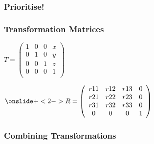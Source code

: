 \documentclass{beamer}
\begin{document}
\begin{frame} \frametitle{Prioritise!}
\end{frame}














\begin{frame} \frametitle{Transformation Matrices}
\begin{math}
T = \left( \begin{array}{cccc}
1 & 0 & 0 & x\\
0 & 1 & 0 & y\\
0 & 0 & 1 & z\\
0 & 0 & 0 & 1\\
\end{array} \right)
\end{math}

\begin{math}
\onslide+<2-> 
R = \left( \begin{array}{cccc}
r11 & r12 & r13 & 0\\
r21 & r22 & r23 & 0\\
r31 & r32 & r33 & 0\\
0 & 0 & 0 & 1\\
\end{array} \right)
\end{math}

\end{frame}

\begin{frame} \frametitle{Combining Transformations}
\begin{figure}[!ht]
\end{figure}
\end{frame}
\end{document}
